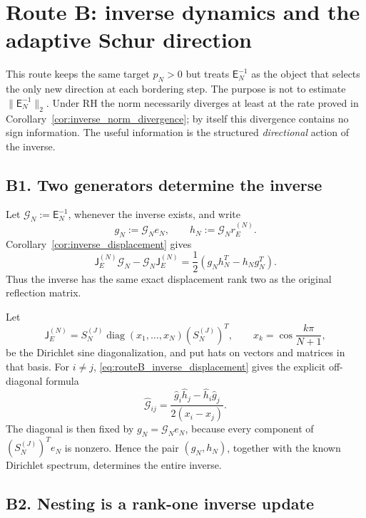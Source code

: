 \documentclass[11pt]{amsart}
\numberwithin{equation}{section}
\theoremstyle{plain}
\theoremstyle{definition}
\theoremstyle{remark}
\newcommand{\E}{\mathsf E}
\newcommand{\J}{\mathsf J}
\newcommand{\diag}{\operatorname{diag}}
\begin{document}
\section{Route B: inverse dynamics and the adaptive Schur direction}
\label{sec:route_B_inverse}

This route keeps the same target \(p_N>0\) but treats \(\E_N^{-1}\) as the object that selects the
only new direction at each bordering step.  The purpose is not to estimate
\(\|\E_N^{-1}\|_2\).  Under RH the norm necessarily diverges at least at the rate proved in
Corollary~\ref{cor:inverse_norm_divergence}; by itself this divergence contains no sign information.  The useful information is the structured
\emph{directional} action of the inverse.

\subsection{B1. Two generators determine the inverse}
\label{subsec:routeB_generators}

Let \(\mathcal G_N:=\E_N^{-1}\), whenever the inverse exists, and write
\[
g_N:=\mathcal G_Ne_N,
\qquad
h_N:=\mathcal G_Nr_E^{(N)}.
\]
Corollary~\ref{cor:inverse_displacement} gives
\begin{equation}
\boxed{
\J_E^{(N)}\mathcal G_N-\mathcal G_N\J_E^{(N)}
=
\frac12(g_Nh_N^T-h_Ng_N^T).}
\label{eq:routeB_inverse_displacement}
\end{equation}
Thus the inverse has the same exact displacement rank two as the original reflection matrix.

Let
\[
\J_E^{(N)}
=S_N^{(J)}\diag(x_1,\ldots,x_N)(S_N^{(J)})^T,
\qquad
x_k=\cos\frac{k\pi}{N+1},
\]
be the Dirichlet sine diagonalization, and put hats on vectors and matrices in that basis.  For
\(i\ne j\), \eqref{eq:routeB_inverse_displacement} gives the explicit off-diagonal formula
\begin{equation}
\boxed{
\widehat{\mathcal G}_{ij}
=
\frac{\widehat g_i\widehat h_j-\widehat h_i\widehat g_j}
{2(x_i-x_j)}.}
\label{eq:routeB_inverse_offdiag}
\end{equation}
The diagonal is then fixed by \(g_N=\mathcal G_Ne_N\), because every component of
\((S_N^{(J)})^Te_N\) is nonzero.  Hence the pair \((g_N,h_N)\), together with the known
Dirichlet spectrum, determines the entire inverse.

\subsection{B2. Nesting is a rank-one inverse update}
\label{subsec:routeB_rankone}
\end{document}
